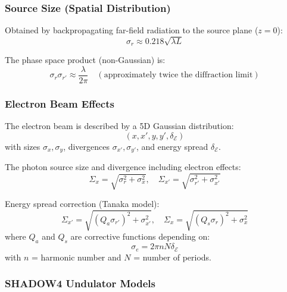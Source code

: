 \subsubsection{Source Size (Spatial Distribution)}

Obtained by backpropagating far-field radiation to the source plane (\(z=0\)):
\begin{equation}\label{eq:elleaumeSize}
\sigma_r \approx 0.218 \sqrt{\lambda L}
\end{equation}

The phase space product (non-Gaussian) is:
\begin{equation}
\sigma_r \sigma_{r'} \approx \frac{\lambda}{2\pi} \quad (\text{approximately twice the diffraction limit})
\end{equation}

\subsubsection{Electron Beam Effects}

The electron beam is described by a 5D Gaussian distribution:
\begin{equation}
(x, x', y, y', \delta_{\mathcal{E}})
\end{equation}
with sizes \(\sigma_x, \sigma_y\), divergences \(\sigma_{x'}, \sigma_{y'}\), and energy spread \(\delta_{\mathcal{E}}\).

The photon source size and divergence including electron effects:
\begin{equation}\label{eq:convNoDispersion}
\Sigma_x = \sqrt{\sigma_r^2 + \sigma_x^2}, \quad \Sigma_{x'} = \sqrt{\sigma_{r'}^2 + \sigma_{x'}^2}
\end{equation}

Energy spread correction (Tanaka model):
\begin{equation}\label{eq:convDispersion}
\Sigma_{x'} = \sqrt{(Q_a \sigma_{r'})^2 + \sigma_{x'}^2}, \quad \Sigma_x = \sqrt{(Q_s \sigma_r)^2 + \sigma_x^2}
\end{equation}
where \(Q_a\) and \(Q_s\) are corrective functions depending on:
\begin{equation}
\sigma_e = 2\pi n N \delta_{\mathcal{E}}
\end{equation}
with \(n\) = harmonic number and \(N\) = number of periods.

\subsubsection{SHADOW4 Undulator Models}

